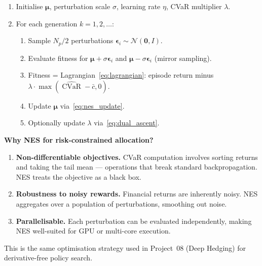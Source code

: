 \documentclass[11pt, a4paper]{article}
\theoremstyle{definition}
\theoremstyle{plain}
\theoremstyle{remark}
\newcommand{\CVaR}{\operatorname{CVaR}}
\begin{document}
\begin{algorithmbox}[title={NES with Mirror Sampling for CVaR-Constrained Allocation}]
\begin{enumerate}[leftmargin=1.5em]
    \item Initialise $\bm{\mu}$, perturbation scale $\sigma$,
          learning rate $\eta$, CVaR multiplier $\lambda$.
    \item For each generation $k = 1, 2, \ldots$:
    \begin{enumerate}[label=(\alph*)]
        \item Sample $N_p/2$ perturbations $\bm{\epsilon}_i \sim
              \mathcal{N}(\bm{0}, I)$.
        \item Evaluate fitness for $\bm{\mu} + \sigma\bm{\epsilon}_i$
              and $\bm{\mu} - \sigma\bm{\epsilon}_i$
              (mirror sampling).
        \item Fitness = Lagrangian~\eqref{eq:lagrangian}: episode return
              minus $\lambda \cdot \max(\widehat{\CVaR} - \bar{c}, 0)$.
        \item Update $\bm{\mu}$ via~\eqref{eq:nes_update}.
        \item Optionally update $\lambda$ via~\eqref{eq:dual_ascent}.
    \end{enumerate}
\end{enumerate}
\end{algorithmbox}

\begin{keyidea}
\textbf{Why NES for risk-constrained allocation?}
\begin{enumerate}[leftmargin=2em]
    \item \textbf{Non-differentiable objectives.} CVaR computation
          involves sorting returns and taking the tail mean --- operations
          that break standard backpropagation. NES treats the objective as
          a black box.
    \item \textbf{Robustness to noisy rewards.} Financial returns are
          inherently noisy. NES aggregates over a population of
          perturbations, smoothing out noise.
    \item \textbf{Parallelisable.} Each perturbation can be evaluated
          independently, making NES well-suited for GPU or multi-core
          execution.
\end{enumerate}
This is the same optimisation strategy used in Project~08 (Deep Hedging)
for derivative-free policy search.
\end{keyidea}
\end{document}
